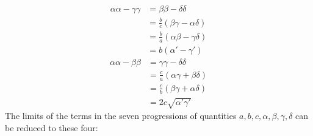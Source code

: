 \[
\begin{aligned}\alpha\alpha-\gamma\gamma&=\beta\beta-\delta\delta
\\&=\frac bc(\beta\gamma-\alpha\delta)\\&=\frac ba(\alpha\beta-\gamma\delta)
\\&=b(\alpha'-\gamma')\end{aligned}
\]
\[
\begin{aligned}\alpha\alpha-\beta\beta&=\gamma\gamma-\delta\delta
\\&=\frac ca(\alpha\gamma+\beta\delta)\\&=\frac cb(\beta\gamma+\alpha\delta)
\\&=2c\surd{\alpha'\gamma'}\end{aligned}
\]
The limits of the terms in the seven progressions of quantities $a,\allowbreak b,\allowbreak c,\allowbreak \alpha,\allowbreak \beta,\allowbreak \gamma,\allowbreak \delta$ can be reduced to these four:

